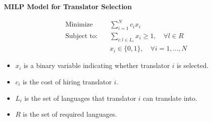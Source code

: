 \documentclass{article}
\begin{document}
\textbf{MILP Model for Translator Selection}

\begin{align*}
\text{Minimize} \quad & \sum_{i=1}^{N} c_i x_i \\
\text{Subject to:} \quad & \sum_{i: l \in L_i} x_i \geq 1, \quad \forall l \in R \\
& x_i \in \{0, 1\}, \quad \forall i = 1, \ldots, N
\end{align*}

\begin{itemize}
    \item \( x_i \) is a binary variable indicating whether translator \( i \) is selected.
    \item \( c_i \) is the cost of hiring translator \( i \).
    \item \( L_i \) is the set of languages that translator \( i \) can translate into.
    \item \( R \) is the set of required languages.
\end{itemize}
\end{document}
